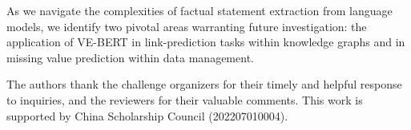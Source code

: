 \documentclass[]{ceurart}
\begin{document}
As we navigate the complexities of factual statement extraction from language models, we identify two pivotal areas warranting future investigation: the application of VE-BERT in link-prediction tasks within knowledge graphs and in missing value prediction within data management.

\begin{acknowledgments}
  The authors thank the challenge organizers for their timely and helpful response to inquiries, and the reviewers for their valuable comments. This work is supported by China Scholarship Council (202207010004). 
\end{acknowledgments}



\appendix
\end{document}
